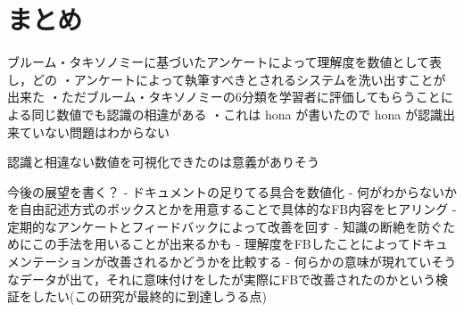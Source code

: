 \section{まとめ}
ブルーム・タキソノミーに基づいたアンケートによって理解度を数値として表し，どの
・アンケートによって執筆すべきとされるシステムを洗い出すことが出来た
・ただブルーム・タキソノミーの6分類を学習者に評価してもらうことによる同じ数値でも認識の相違がある
・これは hona が書いたので hona が認識出来ていない問題はわからない


認識と相違ない数値を可視化できたのは意義がありそう


今後の展望を書く？
- ドキュメントの足りてる具合を数値化
- 何がわからないかを自由記述方式のボックスとかを用意することで具体的なFB内容をヒアリング
- 定期的なアンケートとフィードバックによって改善を回す
- 知識の断絶を防ぐためにこの手法を用いることが出来るかも
- 理解度をFBしたことによってドキュメンテーションが改善されるかどうかを比較する
- 何らかの意味が現れていそうなデータが出て，それに意味付けをしたが実際にFBで改善されたのかという検証をしたい(この研究が最終的に到達しうる点)
